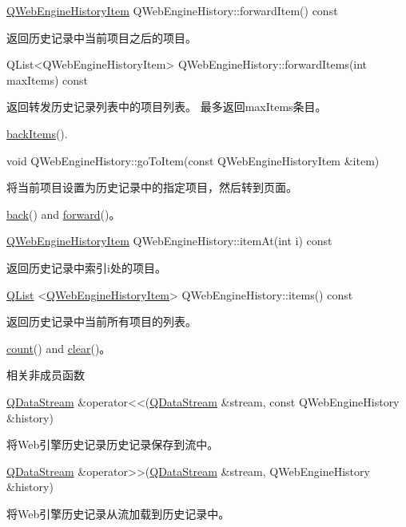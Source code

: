 \href{https://github.com/QtDocumentCN/QtDocumentCN/blob/master/Src/W/QWebEngineHistoryItem/QWebEngineHistoryItem.md}{QWebEngineHistoryItem} QWebEngineHistory::forwardItem() const

返回历史记录中当前项目之后的项目。

QList<QWebEngineHistoryItem> QWebEngineHistory::forwardItems(int maxItems) const

返回转发历史记录列表中的项目列表。 最多返回maxItems条目。

\begin{notice}[另请参阅]
	 \href{https://doc.qt.io/qt-5/qwebenginehistory.html#backItems}{backItems}().
\end{notice}

void QWebEngineHistory::goToItem(const QWebEngineHistoryItem \&item)

将当前项目设置为历史记录中的指定项目，然后转到页面。

\begin{notice}[另请参阅]
\href{https://doc.qt.io/qt-5/qwebenginehistory.html#back}{back}() and \href{https://doc.qt.io/qt-5/qwebenginehistory.html#forward}{forward}()。
\end{notice}

\href{https://github.com/QtDocumentCN/QtDocumentCN/blob/master/Src/W/QWebEngineHistoryItem/QWebEngineHistoryItem.md}{QWebEngineHistoryItem} QWebEngineHistory::itemAt(int i) const

返回历史记录中索引i处的项目。

\href{https://github.com/QtDocumentCN/QtDocumentCN/blob/master/Src/L/QList/QList.md}{QList} <\href{https://github.com/QtDocumentCN/QtDocumentCN/blob/master/Src/W/QWebEngineHistoryItem/QWebEngineHistoryItem.md}{QWebEngineHistoryItem}> QWebEngineHistory::items() const

返回历史记录中当前所有项目的列表。

\begin{notice}[另请参阅]
\href{https://doc.qt.io/qt-5/qwebenginehistory.html#count}{count}() and \href{https://doc.qt.io/qt-5/qwebenginehistory.html#clear}{clear}()。
\end{notice}

相关非成员函数

\href{https://github.com/QtDocumentCN/QtDocumentCN/blob/master/Src/D/QDataStream/QDataStream.md}{QDataStream}  \&operator<<(\href{https://github.com/QtDocumentCN/QtDocumentCN/blob/master/Src/D/QDataStream/QDataStream.md}{QDataStream} \&stream, const QWebEngineHistory \&history)


将Web引擎历史记录历史记录保存到流中。

\href{https://github.com/QtDocumentCN/QtDocumentCN/blob/master/Src/D/QDataStream/QDataStream.md}{QDataStream} \&operator>>(\href{https://github.com/QtDocumentCN/QtDocumentCN/blob/master/Src/D/QDataStream/QDataStream.md}{QDataStream} \&stream, QWebEngineHistory \&history)


将Web引擎历史记录从流加载到历史记录中。

